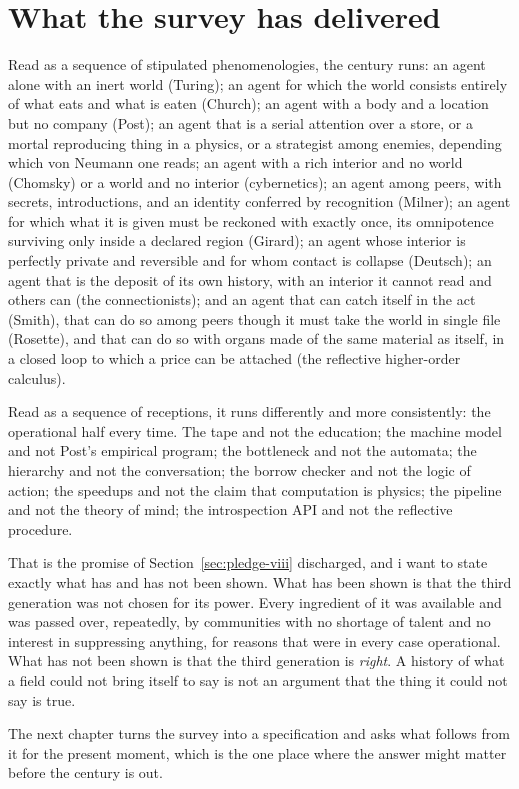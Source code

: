 \section{What the survey has delivered}
\label{psy:sec:delivered}

Read as a sequence of stipulated phenomenologies, the century runs:
an agent alone with an inert world (Turing); an agent for which the
world consists entirely of what eats and what is eaten (Church); an
agent with a body and a location but no company (Post); an agent
that is a serial attention over a store, or a mortal reproducing
thing in a physics, or a strategist among enemies, depending which
von Neumann one reads; an agent with a rich interior and no world
(Chomsky) or a world and no interior (cybernetics); an agent among
peers, with secrets, introductions, and an identity conferred by
recognition (Milner); an agent for which what it is given must be
reckoned with exactly once, its omnipotence surviving only inside a
declared region (Girard); an agent whose interior is perfectly
private and reversible and for whom contact is collapse (Deutsch);
an agent that is the deposit of its own history, with an interior it
cannot read and others can (the connectionists); and an agent that
can catch itself in the act (Smith), that can do so among peers
though it must take the world in single file (Rosette), and that can
do so with organs made of the same material as itself, in a closed
loop to which a price can be attached (the reflective higher-order
calculus).

Read as a sequence of receptions, it runs differently and more
consistently: the operational half every time.
The tape and not the education; the machine model and not Post's
empirical program; the bottleneck and not the automata; the
hierarchy and not the conversation; the borrow checker and not the
logic of action; the speedups and not the claim that computation is
physics; the pipeline and not the theory of mind; the introspection
API and not the reflective procedure.

That is the promise of Section~\ref{sec:pledge-viii} discharged, and
i want to state exactly what has and has not been shown.
What has been shown is that the third generation was not chosen for
its power.
Every ingredient of it was available and was passed over, repeatedly,
by communities with no shortage of talent and no interest in
suppressing anything, for reasons that were in every case
operational.
What has not been shown is that the third generation is
\emph{right}.
A history of what a field could not bring itself to say is not an
argument that the thing it could not say is true.

The next chapter turns the survey into a specification and asks what
follows from it for the present moment, which is the one place where
the answer might matter before the century is out.
